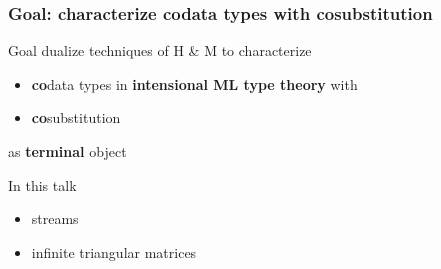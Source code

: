 \documentclass[
]
{beamer}
\newcommand{\fat}[1]{\textbf{#1}}
\begin{document}
\begin{frame}
 \frametitle{Goal: characterize \fat{co}data types with \fat{co}substitution}
 
\begin{block}{Goal}
dualize techniques of H \& M to characterize
  \begin{itemize}
    \item
         \fat{co}data types in \fat{intensional ML type theory} with 
    \item\fat{co}substitution 
  \end{itemize}
    as  \fat{terminal} object
  
 \end{block}
  
\begin{block}{In this talk}
 
  \begin{itemize} 
    \item  streams
    \item  infinite triangular matrices
  \end{itemize}
  
\end{block} 
\end{frame}


\begin{comment}
\begin{frame}
 \frametitle{Binding signatures with (in)equations}
   \begin{block}{Equational theories}
    \begin{itemize}
     \item prime example: lambda calculus modulo $\beta$-equivalence
     \item Fiore with students Hur \& Mahmoud
     \item Hirschowitz \& Maggesi 
    \end{itemize}
   \end{block}
   
  \begin{block}{Reduction rules via \fat{in}equations}
   \begin{itemize}
    \item A., PhD thesis: 
     \begin{itemize}
      \item based on ideas by Hirschowitz \& Maggesi
      \item uses notion of \fat{relative} monad (Altenkirch et al. '10)
     \end{itemize}
   \end{itemize}
  \end{block}
  
  \begin{block}{Goal:}
   do the same for cosyntax, i.e.\ \fat{nested co}data types 
  \end{block}
\end{frame}
\end{comment}
\end{document}
